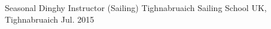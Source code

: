  \cventry
    {Seasonal Dinghy Instructor (Sailing)} %
    {Tighnabruaich Sailing School} %
    {UK, Tighnabruaich} %
    {Jul. 2015} %
    {
    \newline
    }
